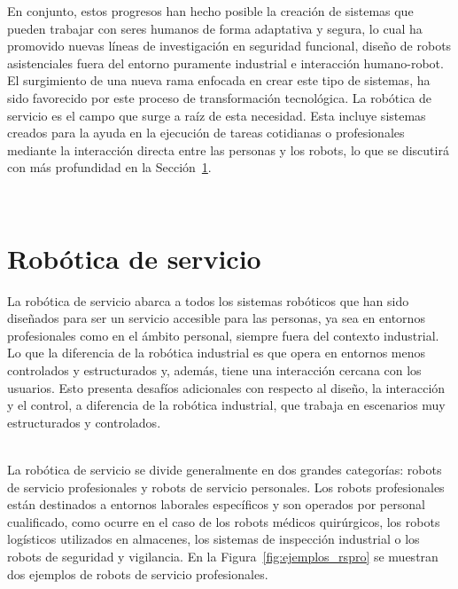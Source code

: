 En conjunto, estos progresos han hecho posible la creación de sistemas que pueden trabajar con seres humanos de forma adaptativa y segura, lo cual ha promovido nuevas líneas de investigación en seguridad funcional, diseño de robots asistenciales fuera del entorno puramente industrial e interacción humano-robot. El surgimiento de una nueva rama enfocada en crear este tipo de sistemas, ha sido favorecido por este proceso de transformación tecnológica. La robótica de servicio es el campo que surge a raíz de esta necesidad. Esta incluye sistemas creados para la ayuda en la ejecución de tareas cotidianas o profesionales mediante la interacción directa entre las personas y los robots, lo que se discutirá con más profundidad en la Sección~\ref{sec:segundaseccion}.

\

\section{Robótica de servicio}
\label{sec:segundaseccion}

La robótica de servicio abarca a todos los sistemas robóticos que han sido diseñados para ser un servicio accesible para las personas, ya sea en entornos profesionales como en el ámbito personal, siempre fuera del contexto industrial. Lo que la diferencia de la robótica industrial es que opera en entornos menos controlados y estructurados y, además, tiene una interacción cercana con los usuarios. Esto presenta desafíos adicionales con respecto al diseño, la interacción y el control, a diferencia de la robótica industrial, que trabaja en escenarios muy estructurados y controlados.\\

\

La robótica de servicio se divide generalmente en dos grandes categorías: robots de servicio profesionales y robots de servicio personales. Los robots profesionales están destinados a entornos laborales específicos y son operados por personal cualificado, como ocurre en el caso de los robots médicos quirúrgicos, los robots logísticos utilizados en almacenes, los sistemas de inspección industrial o los robots de seguridad y vigilancia. En la Figura~\ref{fig:ejemplos_rspro} se muestran dos ejemplos de robots de servicio profesionales.

